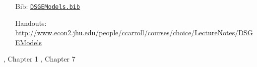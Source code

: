\begin{itemize}
\item[Bib:] \texttt{\href{http://www.econ2.jhu.edu/people/ccarroll/courses/Choice/Syllabus/DSGEModels.bib}{DSGEModels.bib}}
\item[Handouts:]  \url{http://www.econ2.jhu.edu/people/ccarroll/courses/choice/LectureNotes/DSGEModels}
\end{itemize}

\providecommand{\blf}{\cite{blanchard&fischer:text}}
\providecommand{\ro}{\cite{romer:text}}
\bi
\reqd \blf, Chapter 1
\reqd \blf, Chapter 7
\reqd \cite{prescottTheoryAhead}
\reqd \cite{summers:skeptical}
\ei

